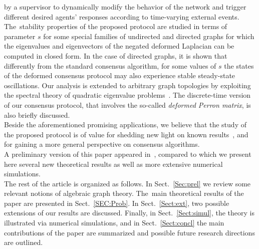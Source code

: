 \documentclass[letterpaper,9pt,twocolumn]{autart}
\begin{document}
by a supervisor to dynamically modify the \mbox{behavior} of the network and trigger
different desired agents' responses according to time-varying external events. The~stability properties of the proposed protocol are studied in terms of parameter $s$ for
some special families of undirected and directed graphs for which the
eigenvalues and eigenvectors of the negated deformed Laplacian can be
computed in closed form. In the case
of directed graphs, it is shown that differently from the standard
consensus algorithm, for some values of $s$ the states of the deformed consensus protocol 
may also experience stable steady-state oscillations.
Our analysis is extended to arbitrary graph topologies by exploiting the spectral theory of quadratic eigenvalue problems~\cite{TisseurMe_SIAM01}.
The discrete-time version of our consensus protocol, that involves
the so-called \emph{deformed Perron matrix}, is also briefly
discussed.\\
Beside the aforementioned promising applications, we
believe that the study of the proposed protocol is of value for shedding 
new light on known results~\cite{OlfatiSaberMu_TAC04,RenBe_TAC05}, 
and for gaining a more general perspective on consensus algorithms.\\
A preliminary version of this paper appeared in~\cite{Morbidi_CDC12},
compared to which we present here several new theoretical results as
well as more extensive numerical simulations.\\
The rest of the article is organized as follows. In
Sect.~\ref{Sec:prel} we review some relevant notions of
algebraic graph theory. The~main theoretical results of the paper are presented in Sect.~\ref{SEC:Prob}.
In Sect.~\ref{Sect:ext}, two possible extensions of our results are discussed. Finally, in Sect.~\ref{Sect:simul}, 
the theory is illustrated via numerical simulations, and in Sect.~\ref{Sect:concl} the main contributions of
the paper are summarized and possible future research directions are outlined.
\end{document}
